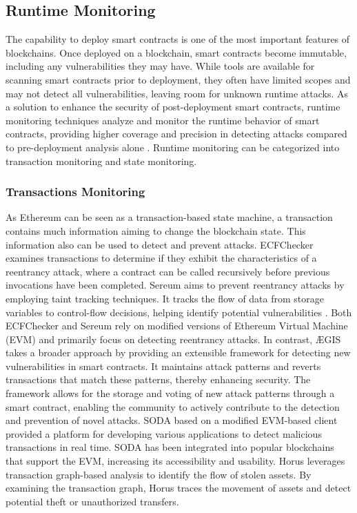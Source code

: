 \documentclass[manuscript,screen]{acmart}
\begin{document}
\subsection{Runtime Monitoring}
The capability to deploy smart contracts is one of the most important features of blockchains. Once deployed on a blockchain, smart contracts become immutable, including any vulnerabilities they may have. While tools are available for scanning smart contracts prior to deployment, they often have limited scopes and may not detect all vulnerabilities, leaving room for unknown runtime attacks. As a solution to enhance the security of post-deployment smart contracts, runtime monitoring techniques analyze and monitor the runtime behavior of smart contracts, providing higher coverage and precision in detecting attacks compared to pre-deployment analysis alone \cite{ellul2018runtime}. Runtime monitoring can be categorized into transaction monitoring and state monitoring. 

\subsubsection{Transactions Monitoring}
As Ethereum can be seen as a transaction-based state machine, a transaction contains much information aiming to change the blockchain state.  This information also can be used to detect and prevent attacks.
ECFChecker \cite{GrossmanAGMRSZ18} examines transactions to determine if they exhibit the characteristics of a reentrancy attack, where a contract can be called recursively before previous invocations have been completed.
Sereum \cite{RodlerLKD19} aims to prevent reentrancy attacks by employing taint tracking techniques. It tracks the flow of data from storage variables to control-flow decisions, helping identify potential vulnerabilities \cite{hu2021transaction, 0002CLLGZLZCHTL20}. Both ECFChecker and Sereum rely on modified versions of Ethereum Virtual Machine (EVM) and primarily focus on detecting reentrancy attacks.
In contrast, ÆGIS \cite{TorresBNJ19, TorresBNPJM20} takes a broader approach by providing an extensible framework for detecting new vulnerabilities in smart contracts. It maintains attack patterns and reverts transactions that match these patterns, thereby enhancing security. The framework allows for the storage and voting of new attack patterns through a smart contract, enabling the community to actively contribute to the detection and prevention of novel attacks. SODA \cite{0002CLLGZLZCHTL20} based on a modified EVM-based client provided a platform for developing various applications to detect malicious transactions in real time. SODA has been integrated into popular blockchains that support the EVM, increasing its accessibility and usability.
Horus \cite{ZhouQTLG21} leverages transaction graph-based analysis to identify the flow of stolen assets. By examining the transaction graph, Horus traces the movement of assets and detect potential theft or unauthorized transfers.
\end{document}
